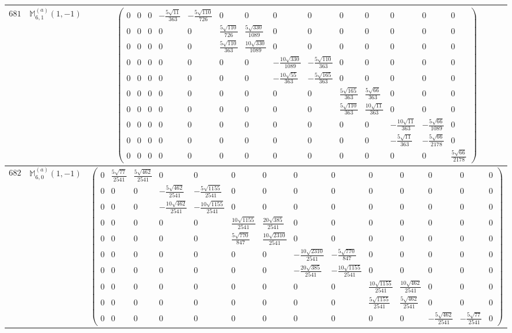 \documentclass[fleqn,8pt,landscape]{jsarticle}
\begin{document}
\begin{center}
\begin{longtable}{ccc}
$ 681 $ & $ \mathbb{M}_{6,1}^{(a)}(1,-1) $ & $ \begin{pmatrix} 0 & 0 & 0 & - \frac{5 \sqrt{11}}{363} & - \frac{5 \sqrt{110}}{726} & 0 & 0 & 0 & 0 & 0 & 0 & 0 & 0 & 0 \\ 0 & 0 & 0 & 0 & 0 & \frac{5 \sqrt{110}}{726} & \frac{5 \sqrt{330}}{1089} & 0 & 0 & 0 & 0 & 0 & 0 & 0 \\ 0 & 0 & 0 & 0 & 0 & \frac{5 \sqrt{110}}{363} & \frac{10 \sqrt{330}}{1089} & 0 & 0 & 0 & 0 & 0 & 0 & 0 \\ 0 & 0 & 0 & 0 & 0 & 0 & 0 & - \frac{10 \sqrt{330}}{1089} & - \frac{5 \sqrt{110}}{363} & 0 & 0 & 0 & 0 & 0 \\ 0 & 0 & 0 & 0 & 0 & 0 & 0 & - \frac{10 \sqrt{55}}{363} & - \frac{5 \sqrt{165}}{363} & 0 & 0 & 0 & 0 & 0 \\ 0 & 0 & 0 & 0 & 0 & 0 & 0 & 0 & 0 & \frac{5 \sqrt{165}}{363} & \frac{5 \sqrt{66}}{363} & 0 & 0 & 0 \\ 0 & 0 & 0 & 0 & 0 & 0 & 0 & 0 & 0 & \frac{5 \sqrt{110}}{363} & \frac{10 \sqrt{11}}{363} & 0 & 0 & 0 \\ 0 & 0 & 0 & 0 & 0 & 0 & 0 & 0 & 0 & 0 & 0 & - \frac{10 \sqrt{11}}{363} & - \frac{5 \sqrt{66}}{1089} & 0 \\ 0 & 0 & 0 & 0 & 0 & 0 & 0 & 0 & 0 & 0 & 0 & - \frac{5 \sqrt{11}}{363} & - \frac{5 \sqrt{66}}{2178} & 0 \\ 0 & 0 & 0 & 0 & 0 & 0 & 0 & 0 & 0 & 0 & 0 & 0 & 0 & \frac{5 \sqrt{66}}{2178} \end{pmatrix} $ \\ \hline
$ 682 $ & $ \mathbb{M}_{6,0}^{(a)}(1,-1) $ & $ \begin{pmatrix} 0 & \frac{5 \sqrt{77}}{2541} & \frac{5 \sqrt{462}}{2541} & 0 & 0 & 0 & 0 & 0 & 0 & 0 & 0 & 0 & 0 & 0 \\ 0 & 0 & 0 & - \frac{5 \sqrt{462}}{2541} & - \frac{5 \sqrt{1155}}{2541} & 0 & 0 & 0 & 0 & 0 & 0 & 0 & 0 & 0 \\ 0 & 0 & 0 & - \frac{10 \sqrt{462}}{2541} & - \frac{10 \sqrt{1155}}{2541} & 0 & 0 & 0 & 0 & 0 & 0 & 0 & 0 & 0 \\ 0 & 0 & 0 & 0 & 0 & \frac{10 \sqrt{1155}}{2541} & \frac{20 \sqrt{385}}{2541} & 0 & 0 & 0 & 0 & 0 & 0 & 0 \\ 0 & 0 & 0 & 0 & 0 & \frac{5 \sqrt{770}}{847} & \frac{10 \sqrt{2310}}{2541} & 0 & 0 & 0 & 0 & 0 & 0 & 0 \\ 0 & 0 & 0 & 0 & 0 & 0 & 0 & - \frac{10 \sqrt{2310}}{2541} & - \frac{5 \sqrt{770}}{847} & 0 & 0 & 0 & 0 & 0 \\ 0 & 0 & 0 & 0 & 0 & 0 & 0 & - \frac{20 \sqrt{385}}{2541} & - \frac{10 \sqrt{1155}}{2541} & 0 & 0 & 0 & 0 & 0 \\ 0 & 0 & 0 & 0 & 0 & 0 & 0 & 0 & 0 & \frac{10 \sqrt{1155}}{2541} & \frac{10 \sqrt{462}}{2541} & 0 & 0 & 0 \\ 0 & 0 & 0 & 0 & 0 & 0 & 0 & 0 & 0 & \frac{5 \sqrt{1155}}{2541} & \frac{5 \sqrt{462}}{2541} & 0 & 0 & 0 \\ 0 & 0 & 0 & 0 & 0 & 0 & 0 & 0 & 0 & 0 & 0 & - \frac{5 \sqrt{462}}{2541} & - \frac{5 \sqrt{77}}{2541} & 0 \end{pmatrix} $ \\ \hline

\end{longtable}
\end{center}
\end{document}
